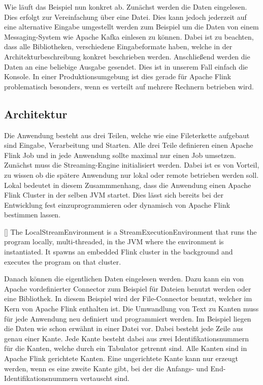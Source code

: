 Wie läuft das Beispiel nun konkret ab. Zunächst werden die Daten eingelesen. Dies
erfolgt zur Vereinfachung über eine Datei. Dies kann jedoch jederzeit auf eine
alternative Eingabe umgestellt werden zum Beispiel um die Daten von einem
Messaging-System wie Apache Kafka einlesen zu können. Dabei ist zu beachten,
dass alle Bibliotheken, verschiedene Eingabeformate haben, welche in der
Architekturbeschreibung konkret beschrieben werden. Anschließend werden die
Daten an eine beliebige Ausgabe gesendet. Dies ist in unserem Fall einfach die
Konsole. In einer Produktionsumgebung ist dies gerade für Apache Flink
problematisch besonders, wenn es verteilt auf mehrere Rechnern betrieben wird.

\subsection{Architektur}
Die Anwendung besteht aus drei Teilen, welche wie eine Fileterkette aufgebaut
sind Eingabe, Verarbeitung und Starten. Alle drei Teile definieren einen Apache
Flink Job und in jede Anwendung sollte maximal nur einen Job umsetzen. Zunächst
muss die Streaming-Engine initialisiert werden. Dabei ist es von Vorteil, zu
wissen ob die spätere Anwendung nur lokal oder remote betrieben werden soll.
Lokal bedeutet in diesem Zusammmenhang, dass die Anwendung einen Apache Flink
Cluster in der selben JVM startet. Dies lässt sich bereits bei der Entwicklung
fest einzuprogrammieren oder dynamisch von Apache Flink bestimmen lassen.

[\cite{Foundation2018}]{
The LocalStreamEnvironment is a StreamExecutionEnvironment that runs the program
locally, multi-threaded, in the JVM where the environment is instantiated. It
spawns an embedded Flink cluster in the background and executes the program on
that cluster.}

Danach können die eigentlichen Daten eingelesen werden. Dazu kann ein von Apache
vordefinierter Connector zum Beispiel für Dateien benutzt werden oder eine
Bibliothek. In diesem Beispiel wird der File-Connector benutzt, welcher im Kern
von Apache Flink enthalten ist. Die Umwandlung von Text zu Kanten muss für jede
Anwendung neu definiert und programmiert werden. Im Beispiel liegen die Daten
wie schon erwähnt in einer Datei vor. Dabei besteht jede Zeile aus genau einer
Kante. Jede Kante besteht dabei aus zwei Identifikationsnummern für die Kanten,
welche durch ein Tabulator getrennt sind. Alle Kanten sind in Apache Flink
gerichtete Kanten. Eine ungerichtete Kante kann nur erzeugt werden, wenn es eine
zweite Kante gibt, bei der die Anfangs- und End-Identifikationsnummern vertauscht
sind.

